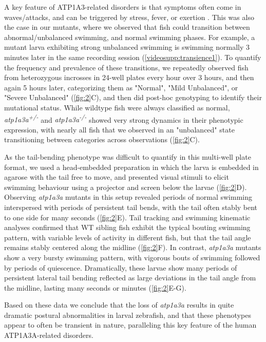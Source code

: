\documentclass[9.5pt,lineno]{RandlettLab_elife}
\begin{document}
A key feature of ATP1A3-related disorders is that symptoms often come in waves/attacks, and can be triggered by stress, fever, or exertion \citep{Salles2021-bq}. This was also the case in our mutants, where we observed that fish could transition between abnormal/unbalanced swimming, and normal swimming phases. 
For example, a mutant larva exhibiting strong unbalanced swimming is swimming normally 3 minutes later in the same recording session (\autoref{videosupp:transience1}).
To quantify the frequency and prevalence of these transitions, we repeatedly observed fish from heterozygous incrosses in 24-well plates every hour over 3 hours, and then again 5 hours later, categorizing them as "Normal", "Mild Unbalanced", or "Severe Unbalanced" (\autoref{fig:2}C), and then did post-hoc genotyping to identify their mutational status. 
While wildtype fish were always classified as normal, \emph{atp1a3a\textsuperscript{+/-}} and \emph{atp1a3a\textsuperscript{-/-}} showed very strong dynamics in their phenotypic expression, with nearly all fish that we observed in an "unbalanced" state transitioning between categories across observations (\autoref{fig:2}C).

As the tail-bending phenotype was difficult to quantify in this multi-well plate format, we used a head-embedded preparation in which the larva is embedded in agarose with the tail free to move, and presented visual stimuli to elicit swimming behaviour using a projector and screen below the larvae (\autoref{fig:2}D).
Observing \emph{atp1a3a} mutants in this setup revealed periods of normal swimming interspersed with periods of persistent tail bends, with the tail often stably bent to one side for many seconds (\autoref{fig:2}E).
Tail tracking and swimming kinematic analyses \citep{Randlett2023} confirmed that WT sibling fish exhibit the typical bouting swimming pattern, with variable levels of activity in different fish, but that the tail angle remains stably centered along the midline (\autoref{fig:2}F).
In contrast, \emph{atp1a3a} mutants show a very bursty swimming pattern, with vigorous bouts of swimming followed by periods of quiescence. 
Dramatically, these larvae show many periods of persistent lateral tail bending reflected as large deviations in the tail angle from the midline, lasting many seconds or minutes (\autoref{fig:2}E-G).

Based on these data we conclude that the loss of \emph{atp1a3a} results in quite dramatic postural abnormalities in larval zebrafish, and that these phenotypes appear to often be transient in nature, paralleling this key feature of the human ATP1A3A-related disorders. 
\end{document}
